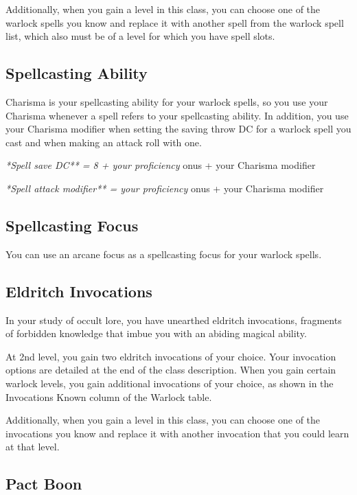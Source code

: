 Additionally, when you gain a level in this class, you can choose one of the warlock spells you know and replace it with another spell from the warlock spell list, which also must be of a level for which you have spell slots.

\subsection{Spellcasting Ability}

Charisma is your spellcasting ability for your warlock spells, so you use your Charisma whenever a spell refers to your spellcasting ability. In addition, you use your Charisma modifier when setting the saving throw DC for a warlock spell you cast and when making an attack roll with one.

\textit{*Spell save DC** = 8 + your proficiency }onus + your Charisma modifier

\textit{*Spell attack modifier** = your proficiency }onus + your Charisma modifier

\subsection{Spellcasting Focus}

You can use an arcane focus as a spellcasting focus for your warlock spells.

\subsection{Eldritch Invocations}

In your study of occult lore, you have unearthed eldritch invocations, fragments of forbidden knowledge that imbue you with an abiding magical ability.

At 2nd level, you gain two eldritch invocations of your choice. Your invocation options are detailed at the end of the class description. When you gain certain warlock levels, you gain additional invocations of your choice, as shown in the Invocations Known column of the Warlock table.

Additionally, when you gain a level in this class, you can choose one of the invocations you know and replace it with another invocation that you could learn at that level.

\subsection{Pact Boon}

